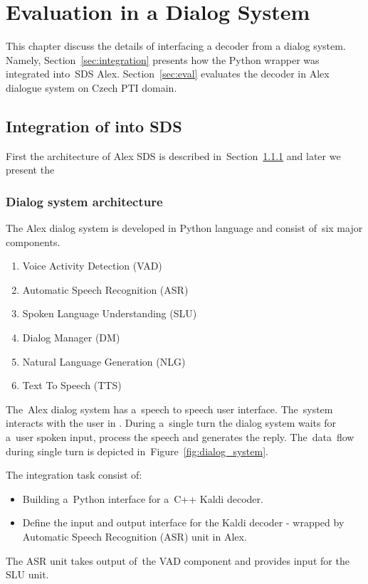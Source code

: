 \chapter{Evaluation in a Dialog System}
\label{cha:integration}
This chapter discuss the details of interfacing a decoder from a dialog system.
Namely, Section~\ref{sec:integration} presents how the Python wrapper  was integrated 
into~\ac{SDS} Alex.
Section~\ref{sec:eval} evaluates the decoder in Alex dialogue system on Czech \ac{PTI} domain. 


\section[ASR integration into SDS]{Integration of  into \ac{SDS}}
\label{sec:}
First the architecture of Alex \ac{SDS} is described in~Section~\ref{sec:arch}
and later we present the 

\subsection{Dialog system architecture} 
\label{sec:arch}
The Alex dialog system is developed in Python language and consist of~six major components. 
\begin{enumerate}
    \item Voice Activity Detection (VAD)
    \item Automatic Speech Recognition (ASR) 
    \item Spoken Language Understanding (SLU)
    \item Dialog Manager (DM)
    \item Natural Language Generation (NLG)
    \item Text To Speech (TTS)
\end{enumerate}
The~Alex dialog system has a~speech to speech user interface. The~system interacts with the user in . During a~single turn the dialog system waits for a~user spoken input, process the speech and generates the reply.
The~data~flow during single turn is depicted in~Figure~\ref{fig:dialog_system}.

The integration task consist of:
\begin{itemize}
    \item Building a~Python interface for a~C++ Kaldi decoder.
    \item Define the input and output interface for the Kaldi decoder - wrapped by Automatic Speech Recognition (ASR) unit in Alex.
\end{itemize}
 The ASR unit takes output of~the VAD component and provides input for the SLU unit. 

